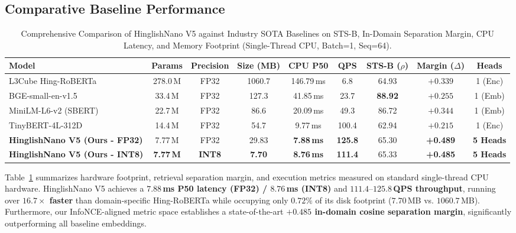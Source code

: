 \documentclass[11pt,a4paper]{article}
\begin{document}
\subsection{Comparative Baseline Performance}

\begin{table}[t]
\centering
\small
\caption{Comprehensive Comparison of HinglishNano V5 against Industry SOTA Baselines on STS-B, In-Domain Separation Margin, CPU Latency, and Memory Footprint (Single-Thread CPU, Batch=1, Seq=64).}
\label{tab:main_results}
\begin{tabular}{lcccccccc}
\toprule
\textbf{Model} & \textbf{Params} & \textbf{Precision} & \textbf{Size (MB)} & \textbf{CPU P50} & \textbf{QPS} & \textbf{STS-B ($\rho$)} & \textbf{Margin ($\Delta$)} & \textbf{Heads} \\
\midrule
L3Cube Hing-RoBERTa~\cite{nayak2021l3cube} & 278.0\,M & FP32 & 1060.7 & 146.79\,ms & 6.8 & 64.93 & $+0.339$ & 1 (Enc) \\
BGE-small-en-v1.5 & 33.4\,M & FP32 & 127.3 & 41.85\,ms & 23.7 & \textbf{88.92} & $+0.255$ & 1 (Emb) \\
MiniLM-L6-v2 (SBERT) & 22.7\,M & FP32 & 86.6 & 20.09\,ms & 49.3 & 86.72 & $+0.344$ & 1 (Emb) \\
TinyBERT-4L-312D~\cite{jiao2020tinybert} & 14.4\,M & FP32 & 54.7 & 9.77\,ms & 100.4 & 62.94 & $+0.215$ & 1 (Enc) \\
\midrule
\textbf{HinglishNano V5 (Ours - FP32)} & 7.77\,M & FP32 & 29.83 & \textbf{7.88\,ms} & \textbf{125.8} & 65.30 & \textbf{+0.489} & \textbf{5 Heads} \\
\textbf{HinglishNano V5 (Ours - INT8)} & \textbf{7.77\,M} & \textbf{INT8} & \textbf{7.70} & \textbf{8.76\,ms} & \textbf{111.4} & 65.33 & \textbf{+0.485} & \textbf{5 Heads} \\
\bottomrule
\end{tabular}
\end{table}

Table~\ref{tab:main_results} summarizes hardware footprint, retrieval separation margin, and execution metrics measured on standard single-thread CPU hardware. HinglishNano V5 achieves a \textbf{$7.88$\,ms P50 latency (FP32) / $8.76$\,ms (INT8)} and \textbf{$111.4\text{--}125.8$\,QPS throughput}, running over \textbf{$16.7\times$ faster} than domain-specific Hing-RoBERTa while occupying only $0.72\%$ of its disk footprint ($7.70$\,MB vs. $1060.7$\,MB). Furthermore, our InfoNCE-aligned metric space establishes a state-of-the-art \textbf{$+0.485$ in-domain cosine separation margin}, significantly outperforming all baseline embeddings.
\end{document}
